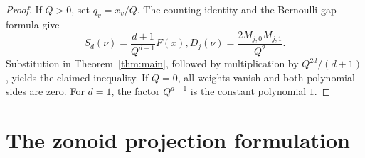 \documentclass[11pt]{article}
\theoremstyle{remark}
\begin{document}
\begin{aiblock}
\begin{proof}
If $Q>0$, set $q_v=x_v/Q$. The counting identity and the Bernoulli gap
formula give
$$S_d(\nu)=\frac{d+1}{Q^{d+1}}F(x), D_j(\nu)=\frac{2M_{j,0}M_{j,1}}{Q^2}.$$
Substitution in Theorem~\ref{thm:main}, followed by multiplication by
$Q^{2d}/(d+1)$, yields the claimed inequality. If $Q=0$, all weights
vanish and both polynomial sides are zero. For $d=1$, the factor
$Q^{d-1}$ is the constant polynomial $1$.
\end{proof}





\end{aiblock}
\section{The zonoid projection formulation}
\label{sec:zonoids}
\end{document}
